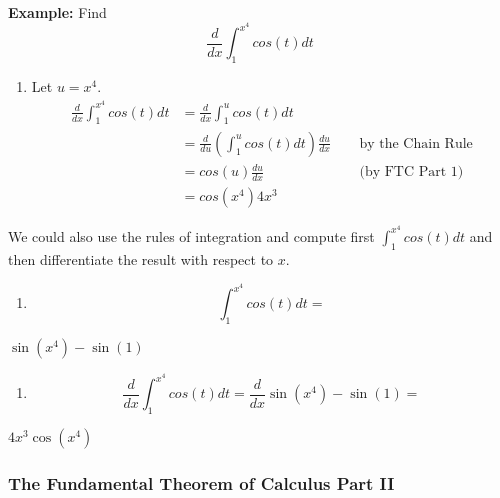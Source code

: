 \documentclass[11pt]{article}
\providecommand{\tightlist}{%
      \setlength{\itemsep}{0pt}\setlength{\parskip}{0pt}}
\newcommand{\prompt}[4]{
        \llap{{\color{#2}[#3]: #4}}\vspace{-1.25em}
    }
\begin{document}
    \begin{center}
    \end{center}
    { \hspace*{\fill} \\}
    
    \textbf{Example:} Find \[
\frac{d}{dx}\int^{x^4}_1 cos(t) dt
\]

\begin{enumerate}
\def\labelenumi{\arabic{enumi}.}
\tightlist
\item
  Let \(u = x^4\). \begin{align}
  \frac{d}{dx}\int^{x^4}_1 cos(t) dt &= \frac{d}{dx}\int^{u}_1 cos(t) dt & \  & \\
  &= \frac{d}{du}\left(\int^{u}_1 cos(t) dt\right)\frac{du}{dx} & \  & \ \text{by the Chain Rule} \\
  &= cos(u)\frac{du}{dx} & \ & \ \text{(by FTC Part 1)} \\
  &= cos(x^4)4x^3
  \end{align}
\end{enumerate}

    We could also use the rules of integration and compute first
\(\int^{x^4}_1 cos(t) dt\) and then differentiate the result with
respect to \(x\).

\begin{enumerate}
\def\labelenumi{\arabic{enumi}.}
\tightlist
\item
  \[
  \int^{x^4}_1 cos(t) dt =
  \]
\end{enumerate}
 
            
\prompt{Out}{outcolor}{9}{}
    
    $\displaystyle \sin{\left(x^{4} \right)} - \sin{\left(1 \right)}$

    

    \begin{enumerate}
\def\labelenumi{\arabic{enumi}.}
\setcounter{enumi}{1}
\tightlist
\item
  \[
  \frac{d}{dx}\int^{x^4}_1 cos(t) dt = \frac{d}{dx} \sin(x^4)-\sin(1) = 
  \]
\end{enumerate}
 
            
\prompt{Out}{outcolor}{10}{}
    
    $\displaystyle 4 x^{3} \cos{\left(x^{4} \right)}$

    

    \hypertarget{the-fundamental-theorem-of-calculus-part-ii}{%
\subsubsection{The Fundamental Theorem of Calculus Part
II}\label{the-fundamental-theorem-of-calculus-part-ii}}
\end{document}
